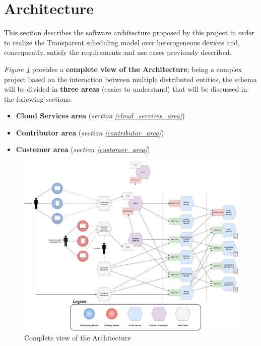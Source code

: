 \section{Architecture}
This section describes the software architecture proposed by this project in order to realize the Transparent scheduling model over heterogeneous devices and, consequently, satisfy the requirements and use cases previously described.

\textit{Figure \ref{fig:architecture_complete}} provides a \textbf{complete view of the Architecture}; being a complex project based on the interaction between multiple distributed entities, the schema will be divided in \textbf{three areas} (easier to understand) that will be discussed in the following sections:
\begin{itemize}
    \item \textbf{Cloud Services area} (\textit{section \ref{cloud_services_area}})
    \item \textbf{Contributor area} (\textit{section \ref{contributor_area}})
    \item \textbf{Customer area} (\textit{section \ref{customer_area}})
\end{itemize}
\begin{figure}[!ht]
    \centering
    \includegraphics[width=\linewidth]{document/chapters/chapter_6/images/architecture_complete.jpg}
    \caption{Complete view of the Architecture}
    \label{fig:architecture_complete}
\end{figure}

